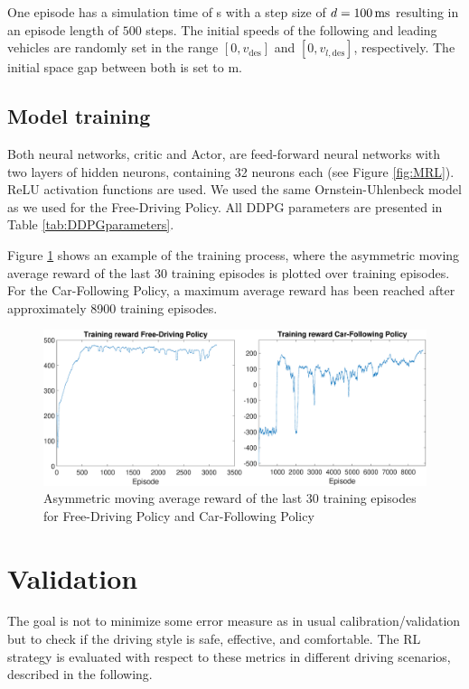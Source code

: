 \documentclass[review]{elsarticle}
\providecommand{\sub}[1]{_{\mathrm{#1}}}  %
\providecommand{\3}{{\ss}}
\begin{document}
One episode has a simulation time of \unit[50]{s} with a step size of
$d=\unit[100]{ms}$ resulting in an episode length of $500$
steps. The initial speeds of the following and leading vehicles are
randomly set in the range $[0,v\sub{des}]$ and $[0,v_{l,\text{des}}]$,
respectively. The initial space gap between both is set to \unit[120]{m}. 

\subsection{Model training}
Both neural networks, critic and Actor, are feed-forward neural networks with two layers of hidden neurons, containing 32 neurons each (see Figure \ref{fig:MRL}). ReLU activation functions are used. We used the same Ornstein-Uhlenbeck model as we used for the Free-Driving Policy.
All DDPG parameters are presented in Table \ref{tab:DDPGparameters}.

Figure \ref{fig:TrainingReward} shows an example of the training
process, where the asymmetric moving average reward of the last 30 training episodes is plotted over training episodes. For the Car-Following Policy, a maximum average reward has been reached after approximately 8900 training episodes.  
%
\begin{figure}
	\centering
	\includegraphics[width=12cm]{images/TrainingReward}
	\caption{Asymmetric moving average reward of the last 30 training episodes for Free-Driving Policy and Car-Following Policy} 
	\label{fig:TrainingReward}
\end{figure}








\section{Validation}
\label{sec:validation}
The goal is not to minimize some error measure as in usual
calibration/validation but to check if the driving style is safe,
effective, and comfortable. The RL strategy is evaluated with respect to these metrics in different driving scenarios, described in the following.
\end{document}
